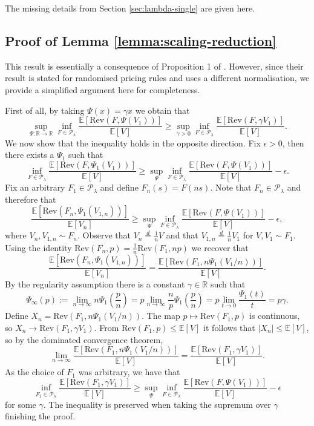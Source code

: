 \documentclass[11pt]{article}
\newcommand{\E}{\mathbb{E}}
\newcommand{\Rev}{\mathrm{Rev}}
\begin{document}
The missing details from Section \ref{sec:lambda-single} are given here.
\subsection{Proof of Lemma \ref{lemma:scaling-reduction}}\label{appendix:scaling-proof}


This result is essentially a consequence of Proposition 1 of \citet{allouah2022pricing}. However, since their result is stated for randomised pricing rules and uses a different normalisation, we provide a simplified argument here for completeness.

First of all, by taking $\Psi(x)=\gamma x$ we obtain that
$$
\sup_{\Psi:\mathbb{R}\to\mathbb{R}}\inf_{F\in\mathcal{P}_\lambda}\frac{\E[\Rev(F,\Psi(V_1))]}{\E[V]}\ge \sup_{\gamma > 0}\inf_{F\in\mathcal{P}_\lambda}\frac{\E[\Rev(F,\gamma V_1)]}{\E[V]}.
$$
We now show that the inequality holds in the opposite direction.
Fix $\epsilon>0$, then there exists a $\Psi_1$ such that
$$
\inf_{F\in\mathcal{P}_\lambda}\frac{\E[\Rev(F,\Psi_1(V_1))]}{\E[V]}\ge \sup_{\Psi}\inf_{F\in\mathcal{P}_\lambda}\frac{\E[\Rev(F,\Psi(V_1))]}{\E[V]}-\epsilon.
$$
Fix an arbitrary $F_1\in\mathcal{P}_\lambda$ and define $F_n(s)=F(ns)$. Note that $F_n\in\mathcal{P}_\lambda$ and therefore that 
$$
\frac{\E[\Rev(F_n,\Psi_1(V_{1,n}))]}{\E[V_n]}\ge \sup_{\Psi}\inf_{F\in\mathcal{P}_\lambda}\frac{\E[\Rev(F,\Psi(V_1))]}{\E[V]}-\epsilon,
$$
where $V_n,V_{1,n}\sim F_n$. Observe that $V_n\overset{d}{=}\frac{1}{n}V$ and that $V_{1,n}\overset{d}{=}\frac{1}{n}V_1$ for $V,V_1\sim F_1$. Using the identity $\Rev(F_n,p)=\frac{1}{n}\Rev(F_1,np)$ we recover that 
$$
\frac{\E[\Rev(F_n,\Psi_1(V_{1,n}))]}{\E[V_n]}=\frac{\E[\Rev(F_1,n\Psi_1(V_1/n))]}{\E[V]}.
$$
By the regularity assumption there is a constant $\gamma\in\mathbb{R}$ such that
$$
\Psi_\infty(p):=\lim_{n\to\infty}n\Psi_1\left(\frac{p}{n}\right)=p\lim_{n\to\infty}\frac{n}{p}\Psi_1\left(\frac{p}{n}\right)=p\lim_{t\to 0}\frac{\Psi_1(t)}{t}=p\gamma.
$$
Define $X_n=\Rev(F_1,n\Psi_1(V_1/n))$. 
The map $p\mapsto\Rev(F_1,p)$ is continuous, so $X_n\to\Rev(F_1,\gamma V_1)$.
From $\Rev(F_1,p)\le \E[V]$ it follows that $|X_n|\le \E[V]$, so by the dominated convergence theorem,
$$
\lim_{n\to\infty}\frac{\E[\Rev(F_1,n\Psi_1(V_1/n))]}{\E[V]}=\frac{\E[\Rev(F_1,\gamma V_1)]}{\E[V]}.
$$
As the choice of $F_1$ was arbitrary, we have that
$$
\inf_{F_1\in\mathcal{P}_\lambda}\frac{\E[\Rev(F_1,\gamma V_1)]}{\E[V]}\ge \sup_{\Psi}\inf_{F\in\mathcal{P}_\lambda}\frac{\E[\Rev(F,\Psi(V_1))]}{\E[V]}-\epsilon
$$
for some $\gamma$. The inequality is preserved when taking the supremum over $\gamma$ finishing the proof. 
\end{document}
